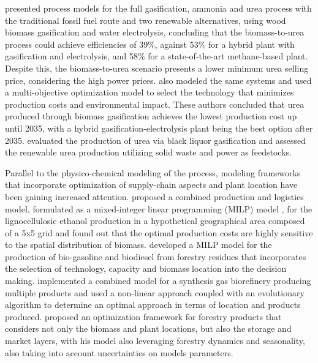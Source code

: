 \documentclass[a4paper, titlepage]{article}
\begin{document}
\textcite{zhangTechnoeconomicComparison1002021} presented process models for the full gasification, ammonia and urea
process with the traditional fossil fuel route and two renewable alternatives, using wood biomass gasification and water
electrolysis, concluding that the biomass-to-urea process could achieve efficiencies of 39\%, against 53\% for a
hybrid plant with gasification and electrolysis, and 58\% for a state-of-the-art methane-based plant. Despite this, the
biomass-to-urea scenario presents a lower minimum urea selling price, considering the high power prices.
\textcite{alfianMultiobjectiveOptimizationGreen2019} also modeled the same systems and used a
multi-objective optimization model to select the technology that minimizes production costs and environmental impact.
These authors concluded that urea produced through biomass gasification achieves the lowest production cost up until
2035, with a hybrid gasification-electrolysis plant being the best option after 2035.
\textcite{domingosExergyEnvironmentalAnalysis2021} evaluated the production of urea via black liquor gasification
and \textcite{gyanwaliTechnoeconomicAssessmentGreen2023} assessed the renewable urea production utilizing solid waste
and power as feedstocks.

Parallel to the physico-chemical modeling of the process, modeling frameworks that incorporate optimization of
supply-chain aspects and plant location have been gaining increased attention.
\textcite{dunnettSpatiallyExplicitWholesystem2008} proposed a combined production and logistics model, formulated as a
mixed-integer linear programming (MILP) model , for the lignocellulosic ethanol production in a hypothetical
geographical area composed of a 5x5 grid and found out that the optimal production costs are highly sensitive to the
spatial distribution of biomass. \textcite{kimDesignBiomassProcessing2011} developed a MILP model for the production of
bio-gasoline and biodiesel from forestry residues that incorporates the selection of technology, capacity and biomass
location into the decision making. \textcite{schroderImprovingBiorefineryPlanning2018} implemented a combined model for
a synthesis gas biorefinery producing multiple products and used a non-linear approach coupled with an evolutionary
algorithm to determine an optimal approach in terms of location and products produced.
\citeauthor{theozzoMILPFrameworkOptimal2021} \cite{theozzoMILPFrameworkOptimal2021,
    theozzoRobustOptimizationFramework2023} proposed an optimization framework for forestry products that considers not only
the biomass and plant locations, but also the storage and market layers, with his model also leveraging forestry
dynamics and seasonality, also taking into account uncertainties on models parameters.
\end{document}
